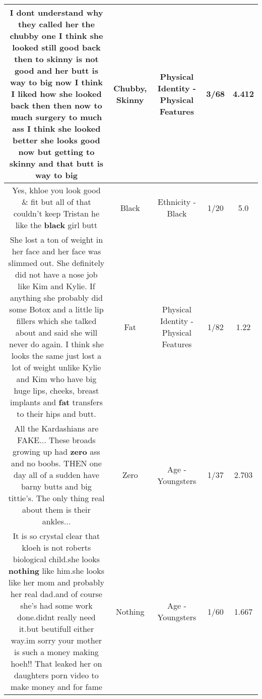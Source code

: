 \documentclass[11pt]{article}
\newlength\mylength
\begin{document}
\begin{center}
\begin{longtable}{|C{.65\mylength}|C{.30\mylength}|C{.12\mylength}|C{.12\mylength}|C{.12\mylength}|}
  \small I dont understand why they called her the \textbf{chubby} one I think she looked still good back then to \textbf{skinny} is not good and her butt is way to big now I think I liked how she looked back then then now to much surgery to much ass I think she looked better she looks good now but getting to \textbf{skinny} and that butt is way to big\normalsize   & Chubby, Skinny & Physical Identity - Physical Features & 3/68 & 4.412 \\  \hline
  \small Yes, khloe you look good \& fit but all of that couldn't keep Tristan he like the \textbf{black} girl butt\normalsize   & Black & Ethnicity - Black & 1/20 & 5.0 \\  \hline
  \small She lost a ton of weight in her face and her face was slimmed out. She definitely did not have a nose job like Kim and Kylie. If anything she probably did some Botox and a little lip fillers which she talked about and said she will never do again. I think she looks the same just lost a lot of weight unlike Kylie and Kim who have big huge lips, cheeks, breast implants and \textbf{fat} transfers to their hips and butt.\normalsize   & Fat & Physical Identity - Physical Features & 1/82 & 1.22 \\  \hline
  \small All the Kardashians are FAKE... These broads growing up had \textbf{zero} ass and no boobs. THEN one day all of a sudden have barny butts and big tittie's. The only thing real about them is their ankles...\normalsize   & Zero & Age - Youngsters & 1/37 & 2.703 \\  \hline
  \small It is so crystal clear that kloeh is not roberts biological child.she looks \textbf{nothing} like him.she looks like her mom and probably her real dad.and of course she's had some work done.didnt really need it.but beutifull either way.im sorry your mother is such a money making hoeh!! That leaked her on daughters porn video to make money and for fame\normalsize   & Nothing & Age - Youngsters & 1/60 & 1.667 \\  \hline

\end{longtable}
\end{center}
\end{document}
